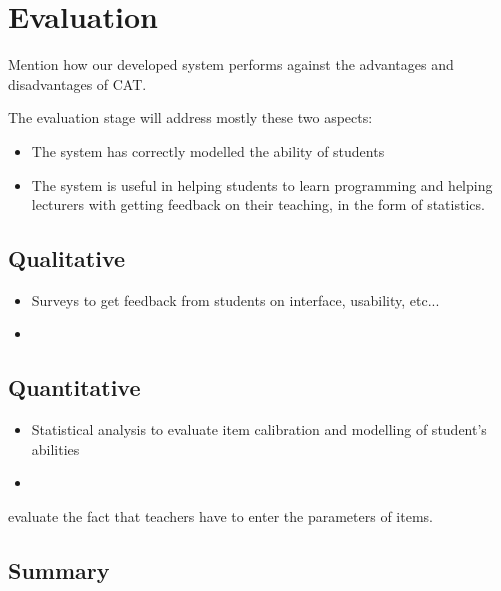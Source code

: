 \chapter{Evaluation}
Mention how our developed system performs against the advantages and disadvantages of CAT.

The evaluation stage will address mostly these two aspects:
\begin{itemize}
\item The system has correctly modelled the ability of students
\item The system is useful in helping students to learn programming and helping lecturers with getting feedback on their teaching, in the form of statistics.
\end{itemize}

\section{Qualitative}
\begin{itemize}
\item Surveys to get feedback from students on interface, usability, etc...
\item 
\end{itemize}

\section{Quantitative}
\begin{itemize}
\item Statistical analysis to evaluate item calibration and modelling of student's abilities
\item 
\end{itemize}

evaluate the fact that teachers have to enter the parameters of items.

\section{Summary}